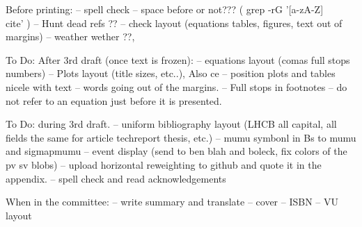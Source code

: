 Before printing:
-- spell check
-- space before \cite{} or not??? ( grep -rG  '[a-zA-Z]\\cite' )
-- Hunt dead refs ??
-- check layout (equations tables, figures, text out of margins)
-- weather wether ??,

To Do: After 3rd draft (once text is frozen):
-- equations layout (comas full stops numbers)
-- Plots layout (title sizes, etc..), Also ce
-- position plots and tables nicele with text
-- words going out of the margins.
-- Full stops in footnotes
-- do not refer to an equation just before it is presented.

To Do: during 3rd draft.
-- uniform bibliography layout (LHCB all capital, all fields the same for article techreport thesis, etc.)
-- mumu symbonl in Bs to mumu and sigmapmumu
-- event display (send to ben blah and boleck, fix colors of the pv sv blobs)
-- upload horizontal reweighting to github and quote it in the appendix.
-- spell check and read acknowledgements

When in the committee:
-- write summary and translate
-- cover
-- ISBN
-- VU layout
